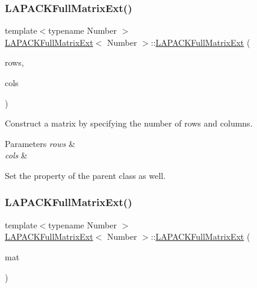 \subsubsection{\texorpdfstring{L\+A\+P\+A\+C\+K\+Full\+Matrix\+Ext()}{LAPACKFullMatrixExt()}\hspace{0.1cm}{\footnotesize\ttfamily [2/10]}}
{\footnotesize\ttfamily template$<$typename Number $>$ \\
\hyperlink{classLAPACKFullMatrixExt}{L\+A\+P\+A\+C\+K\+Full\+Matrix\+Ext}$<$ Number $>$\+::\hyperlink{classLAPACKFullMatrixExt}{L\+A\+P\+A\+C\+K\+Full\+Matrix\+Ext} (\begin{DoxyParamCaption}\item[{const \hyperlink{classLAPACKFullMatrixExt_a5cf5f4a6104dc17029210b5ca52bf574}{size\+\_\+type}}]{rows,  }\item[{const \hyperlink{classLAPACKFullMatrixExt_a5cf5f4a6104dc17029210b5ca52bf574}{size\+\_\+type}}]{cols }\end{DoxyParamCaption})}

Construct a matrix by specifying the number of rows and columns. 
\begin{DoxyParams}{Parameters}
{\em rows} & \\
\hline
{\em cols} & \\
\hline
\end{DoxyParams}
Set the property of the parent class as well.\mbox{\label{classLAPACKFullMatrixExt_a95c6843f5138c51aa42b554ec843b717}} 
\subsubsection{\texorpdfstring{L\+A\+P\+A\+C\+K\+Full\+Matrix\+Ext()}{LAPACKFullMatrixExt()}\hspace{0.1cm}{\footnotesize\ttfamily [3/10]}}
{\footnotesize\ttfamily template$<$typename Number $>$ \\
\hyperlink{classLAPACKFullMatrixExt}{L\+A\+P\+A\+C\+K\+Full\+Matrix\+Ext}$<$ Number $>$\+::\hyperlink{classLAPACKFullMatrixExt}{L\+A\+P\+A\+C\+K\+Full\+Matrix\+Ext} (\begin{DoxyParamCaption}\item[{const \hyperlink{classLAPACKFullMatrixExt}{L\+A\+P\+A\+C\+K\+Full\+Matrix\+Ext}$<$ Number $>$ \&}]{mat }\end{DoxyParamCaption})}

